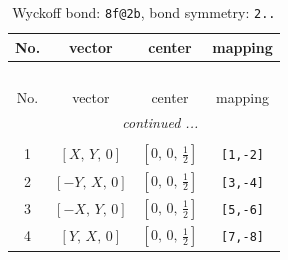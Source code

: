 \documentclass[fleqn,8pt]{jsarticle}
\begin{document}
\renewcommand{\arraystretch}{1.2}
\begin{longtable}{cccc}
\caption{Wyckoff bond: {\tt 8f@2b}, bond symmetry: {\tt 2..}}
 \\
 \hline \hline
No. & vector & center & mapping \\ \hline \endfirsthead

\multicolumn{3}{l}{\tablename\ \thetable{}} \\
 \hline \hline
No. & vector & center & mapping \\ \hline \endhead

 \hline \hline
\multicolumn{3}{r}{\footnotesize\it continued ...} \\ \endfoot

 \hline \hline
\multicolumn{3}{r}{} \\ \endlastfoot

1 & $\left[ X,\, Y,\, 0 \right]$ & $\left[ 0,\, 0,\, \frac{1}{2} \right]$ & {\tt [1,-2]} \\ \hline
2 & $\left[ - Y,\, X,\, 0 \right]$ & $\left[ 0,\, 0,\, \frac{1}{2} \right]$ & {\tt [3,-4]} \\ \hline
3 & $\left[ - X,\, Y,\, 0 \right]$ & $\left[ 0,\, 0,\, \frac{1}{2} \right]$ & {\tt [5,-6]} \\ \hline
4 & $\left[ Y,\, X,\, 0 \right]$ & $\left[ 0,\, 0,\, \frac{1}{2} \right]$ & {\tt [7,-8]} \\
\end{longtable}
\renewcommand{\arraystretch}{1.2}
\end{document}
